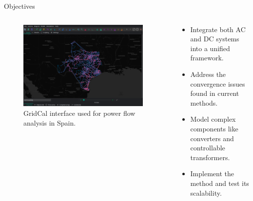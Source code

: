 \begin{frame}{Objectives}
    \begin{columns}
        \begin{column}{0.6\textwidth}
            \begin{figure}[H]
                \centering
                \includegraphics[width=0.95\textwidth]{chapter5pics/gridcalUI.png}
                \caption{GridCal interface used for power flow analysis in Spain.}
                \label{fig:gridcal_interface}
            \end{figure}
        \end{column}
        
        \begin{column}{0.4\textwidth}
            \begin{itemize}
                \item Integrate both AC and DC systems into a unified framework.
                \item Address the convergence issues found in current methods.
                \item Model complex components like converters and controllable transformers.
                \item Implement the method and test its scalability.
            \end{itemize}
        \end{column}
    \end{columns}
\end{frame}


